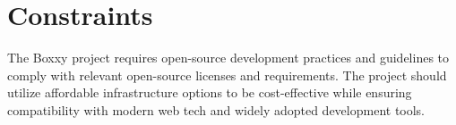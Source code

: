 
\chapter{Constraints} %

\label{Chapter3} %


The Boxxy project requires open-source development practices and guidelines to comply with relevant open-source licenses and requirements. The project should utilize affordable infrastructure options to be cost-effective while ensuring compatibility with modern web tech and widely adopted development tools.